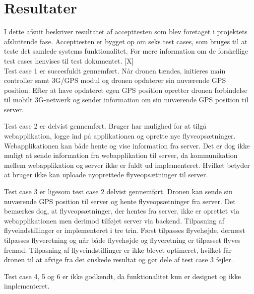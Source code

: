 \section{Resultater}

I dette afsnit beskriver resultatet af accepttesten som blev foretaget i projektets afsluttende fase. 
Accepttesten er bygget op om seks test cases, som bruges til at teste det samlede systems funktionalitet. For mere information om de forskellige test cases henvises til test dokumentet. [X] \\

Test case 1 er succesfuldt gennemført. Når dronen tændes, initieres main controller samt 3G/GPS modul og dronen opdaterer sin nuværende GPS position. Efter at have opdateret egen GPS position opretter dronen forbindelse til mobilt 3G-netværk og sender information om sin nuværende GPS position til server.

Test case 2 er delvist gennemført. Bruger har mulighed for at tilgå webapplikation, logge ind på applikationen og oprette nye flyveopsætninger. Webapplikationen kan både hente og vise information fra server. Det er dog ikke muligt at sende information fra webapplikation til server, da kommunikation mellem webapplikation og server ikke er fuldt ud implementeret. Hvilket betyder at bruger ikke kan uploade nyoprettede flyveopsætninger til server.  

Test case 3 er ligesom test case 2 delvist gennemført. Dronen kan sende sin nuværende GPS position til server og hente flyveopsætninger fra server. Det bemærkes dog, at flyveopsætninger, der hentes fra server, ikke er oprettet via webapplikationen men derimod tilføjet server via backend. 
Tilpasning af flyveindstillinger er implementeret i tre trin. Først tilpasses flyvehøjde, dernæst tilpasses flyveretning og når både flyvehøjde og flyveretning er tilpasset flyves fremad.
Tilpasning af flyveindstillinger er ikke blevet optimeret, hvilket får dronen til at afvige fra det ønskede resultat og gør dele af test case 3 fejler.

Test case 4, 5 og 6 er ikke godkendt, da funktionalitet kun er designet og ikke implementeret.
